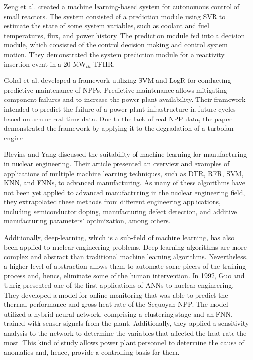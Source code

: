 Zeng et al. \cite{zeng_machine_2017} created a machine learning-based system for autonomous control of small reactors.
The system consisted of a prediction module using \gls*{SVR} to estimate the state of some system variables, such as coolant and fuel temperatures, flux, and power history.
The prediction module fed into a decision module, which consisted of the control decision making and control system motion.
They demonstrated the system prediction module for a reactivity insertion event in a 20 MW$_{th}$ \gls*{TFHR}.

Gohel et al. \cite{gohel_predictive_2020} developed a framework utilizing \gls*{SVM} and \gls*{LogR} for conducting predictive maintenance of \glspl*{NPP}.
Predictive maintenance allows mitigating component failures and to increase the power plant availability.
Their framework intended to predict the failure of a power plant infrastructure in future cycles based on sensor real-time data.
Due to the lack of real NPP data, the paper demonstrated the framework by applying it to the degradation of a turbofan engine.

Blevins and Yang \cite{blevins_machine_2020} discussed the suitability of machine learning for manufacturing in nuclear engineering.
Their article presented an overview and examples of applications of multiple machine learning techniques, such as \gls*{DTR}, \gls*{RFR}, \gls*{SVM}, \gls*{KNN}, and \glspl*{FNN}, to advanced manufacturing.
As many of these algorithms have not been yet applied to advanced manufacturing in the nuclear engineering field, they extrapolated these methods from different engineering applications, including semiconductor doping, manufacturing defect detection, and additive manufacturing parameters' optimization, among others.

Additionally, deep-learning, which is a sub-field of machine learning, has also been applied to nuclear engineering problems.
Deep-learning algorithms are more complex and abstract than traditional machine learning algorithms.
Nevertheless, a higher level of abstraction allows them to automate some pieces of the training process and, hence, eliminate some of the human intervention.
In 1992, Guo and Uhrig \cite{guo_use_1992} presented one of the first applications of \glspl*{ANN} to nuclear engineering.
They developed a model for online monitoring that was able to predict the thermal performance and gross heat rate of the Sequoyah \gls*{NPP}.
The model utilized a hybrid neural network, comprising a clustering stage and an \gls*{FNN}, trained with sensor signals from the plant.
Additionally, they applied a sensitivity analysis to the network to determine the variables that affected the heat rate the most.
This kind of study allows power plant personnel to determine the cause of anomalies and, hence, provide a controlling basis for them.

